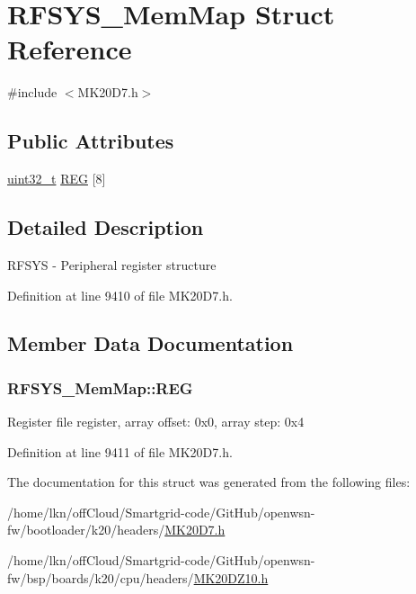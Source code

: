 \hypertarget{struct_r_f_s_y_s___mem_map}{}\section{R\+F\+S\+Y\+S\+\_\+\+Mem\+Map Struct Reference}
\label{struct_r_f_s_y_s___mem_map}


{\ttfamily \#include $<$M\+K20\+D7.\+h$>$}

\subsection*{Public Attributes}
\begin{DoxyCompactItemize}
\item 
\hyperlink{_p_e___types_8h_a33594304e786b158f3fb30289278f5af}{uint32\+\_\+t} \hyperlink{struct_r_f_s_y_s___mem_map_adb9794ad2cefbdc6af2bc0fb6fc434f7}{R\+EG} \mbox{[}8\mbox{]}
\end{DoxyCompactItemize}


\subsection{Detailed Description}
R\+F\+S\+YS -\/ Peripheral register structure 

Definition at line 9410 of file M\+K20\+D7.\+h.



\subsection{Member Data Documentation}
\subsubsection[{\texorpdfstring{R\+EG}{REG}}]{ R\+F\+S\+Y\+S\+\_\+\+Mem\+Map\+::\+R\+EG}\hypertarget{struct_r_f_s_y_s___mem_map_adb9794ad2cefbdc6af2bc0fb6fc434f7}{}\label{struct_r_f_s_y_s___mem_map_adb9794ad2cefbdc6af2bc0fb6fc434f7}
Register file register, array offset\+: 0x0, array step\+: 0x4 

Definition at line 9411 of file M\+K20\+D7.\+h.



The documentation for this struct was generated from the following files\+:\begin{DoxyCompactItemize}
\item 
/home/lkn/off\+Cloud/\+Smartgrid-\/code/\+Git\+Hub/openwsn-\/fw/bootloader/k20/headers/\hyperlink{bootloader_2k20_2headers_2_m_k20_d7_8h}{M\+K20\+D7.\+h}\item 
/home/lkn/off\+Cloud/\+Smartgrid-\/code/\+Git\+Hub/openwsn-\/fw/bsp/boards/k20/cpu/headers/\hyperlink{_m_k20_d_z10_8h}{M\+K20\+D\+Z10.\+h}\end{DoxyCompactItemize}
